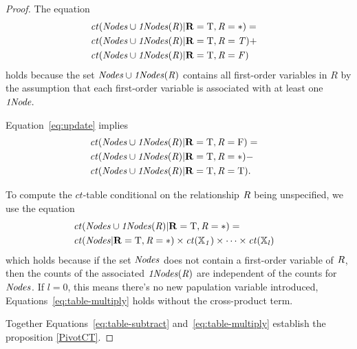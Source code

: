 \documentclass{vldb}
\newcommand{\ct}{\mathit{ct}}
\begin{document}
\begin{proof}
The equation 
\begin{align}
&\ct(\Nodes  \cup \eatts(R)|\set{R} = \true, R = *) = &\label{eq:update}  \\ 
&\ct(\Nodes  \cup \eatts(R)|\set{R} = \true, R = T)  + & \nonumber \\ 
&\ct(\Nodes  \cup \eatts(R)|\set{R} = \true, R = F) & \nonumber
\end{align}
holds because the set $\it{Nodes} \cup \it{1Nodes}(R)$ contains all first-order variables in $R$ by the assumption that each first-order variable is associated with at least one $\it{1Node} .$ %

 Equation~\eqref{eq:update} implies
\begin{align} 
&\ct(\Nodes  \cup \eatts(R)|\set{R} = \true, R = \false) =& \label{eq:table-subtract} \\ 
&\ct(\Nodes  \cup \eatts(R)|\set{R} = \true, R = *) -&\nonumber  \\
 & \ct(\Nodes  \cup \eatts(R)|\set{R} = \true, R = \true).& \nonumber
\end{align}

To compute the $\ct$-table conditional on the relationship $R$ being unspecified, we use the equation
\begin{align}
&\ct(\Nodes  \cup \eatts(R)|\set{R} = \true, R = *) =  &\label{eq:table-multiply}\\
&\ct(\Nodes|\set{R} = \true, R =*) \times \ct(\X_{1}) \times \cdots \times \ct(\X_{l})& \nonumber
\end{align}
which holds because if the set $\it{Nodes}$ does not contain a first-order variable of $R$, then the counts of the associated $\it{1Nodes}(R)$ are independent of the counts for $\it{Nodes}$. 
If $l = 0$, this means there's no new papulation variable introduced, Equations~\eqref{eq:table-multiply} holds without  the cross-product term.

Together Equations~\eqref{eq:table-subtract} and~\eqref{eq:table-multiply} establish the proposition \ref{PivotCT}.
\end{proof}
\end{document}
